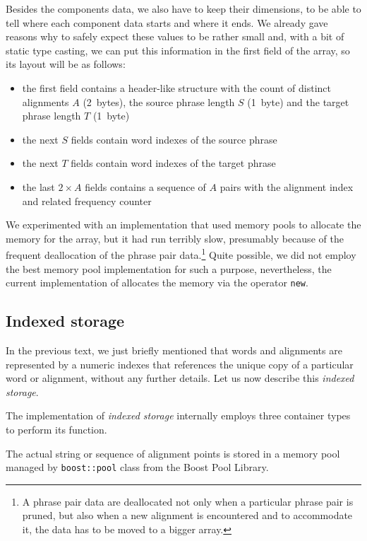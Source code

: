 Besides the components data, we also have to keep their dimensions,
to be able to tell where each component data starts and where it ends.
We already gave reasons why to safely expect these values to be rather small and,
with a bit of static type casting, we can put this information in the first field
of the array, so its layout will be as follows:
\begin{itemize}
  \item the first field contains a header-like structure with the count
    of distinct alignments $A$ (2~bytes),
    the source phrase length $S$ (1~byte) and the target phrase length $T$ (1~byte)
  \item the next $S$ fields contain word indexes of the source phrase
  \item the next $T$ fields contain word indexes of the target phrase
  \item the last $2 \times A$ fields contains a sequence of $A$ pairs with
    the alignment index and related frequency counter
\end{itemize}

We experimented with an implementation that used memory pools to allocate the memory
for the array, but it had run terribly slow, presumably because of the frequent deallocation
of the phrase pair data.\footnote{A phrase pair data are deallocated not only when a particular
phrase pair is pruned, but also when a new alignment is encountered and to accommodate it,
the data has to be moved to a bigger array.}
Quite possible, we did not employ the best memory pool implementation for such a purpose,
nevertheless, the current implementation of \eppex{} allocates the memory via the operator
\texttt{new}.

\subsection{Indexed storage}

In the previous text, we just briefly mentioned that words and alignments are represented
by a numeric indexes that references the unique copy of a particular word or alignment,
without any further details. Let us now describe this \emph{indexed storage}.

The implementation of \emph{indexed storage} internally employs three container types to perform its function.

The actual string or sequence of alignment points is stored in a memory pool managed by
\texttt{boost::pool} class from the Boost Pool Library.

